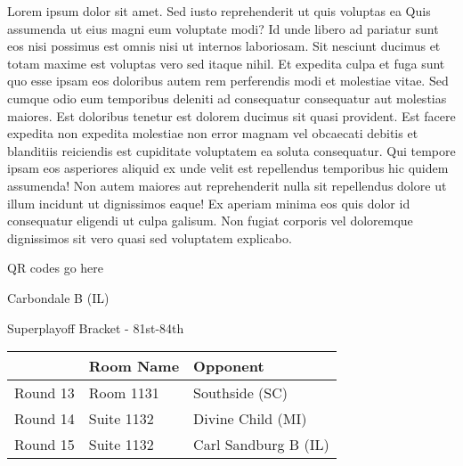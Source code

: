 \documentclass{article}%
\begin{document}
\vspace*{8pt}%
\linebreak%
\newline%
\newline%
Lorem ipsum dolor sit amet. Sed iusto reprehenderit ut quis voluptas ea Quis assumenda ut eius magni eum voluptate modi? Id unde libero ad pariatur sunt eos nisi possimus est omnis nisi ut internos laboriosam. Sit nesciunt ducimus et totam maxime est voluptas vero sed itaque nihil. Et expedita culpa et fuga sunt quo esse ipsam eos doloribus autem rem perferendis modi et molestiae vitae.\newline%
\newline%
Sed cumque odio eum temporibus deleniti ad consequatur consequatur aut molestias maiores. Est doloribus tenetur est dolorem ducimus sit quasi provident. Est facere expedita non expedita molestiae non error magnam vel obcaecati debitis et blanditiis reiciendis est cupiditate voluptatem ea soluta consequatur. Qui tempore ipsam eos asperiores aliquid ex unde velit est repellendus temporibus hic quidem assumenda!\newline%
\newline%
Non autem maiores aut reprehenderit nulla sit repellendus dolore ut illum incidunt ut dignissimos eaque! Ex aperiam minima eos quis dolor id consequatur eligendi ut culpa galisum. Non fugiat corporis vel doloremque dignissimos sit vero quasi sed voluptatem explicabo.\newline%
\newline%
%
\vspace*{30pt}%
\begin{center}%
\begin{Huge}%
QR codes go here%
\end{Huge}%
\end{center}%
\newpage%
\begin{center}%
\begin{Huge}%
Carbondale B (IL)%
\end{Huge}%
\vspace*{8pt}%
\linebreak%
\begin{Large}%
Superplayoff Bracket {-} 81st{-}84th%
\end{Large}%
\end{center}%
%
\begin{tabularx}{\textwidth}{|c|Y|Y|}%
\hline%
&Room Name&Opponent\\%
\hline%
Round 13&Room 1131&Southside (SC)\\%
Round 14&Suite 1132&Divine Child (MI)\\%
Round 15&Suite 1132&Carl Sandburg B (IL)\\%
\hline%
\end{tabularx}%
\end{document}
